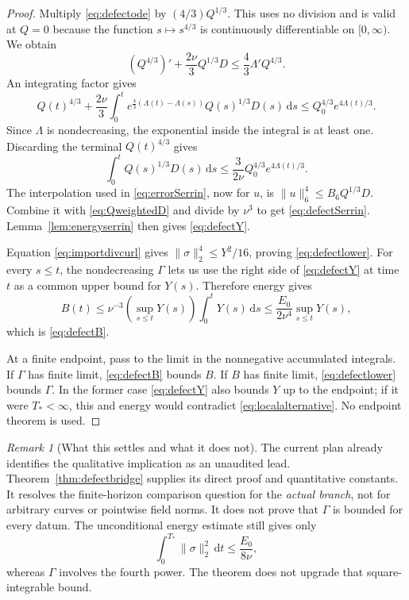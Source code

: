 \documentclass[11pt,a4paper]{article}
\theoremstyle{definition}\newtheorem{definition}[theorem]{Definition}
\theoremstyle{remark}\newtheorem{remark}[theorem]{Remark}
\newcommand{\dd}{\,\mathrm d}
\newcommand{\norm}[1]{\lVert #1\rVert}
\numberwithin{equation}{section}
\begin{document}
\begin{proof}
Multiply \eqref{eq:defectode} by $(4/3)Q^{1/3}$. This uses no division and is valid at $Q=0$ because the function $s\mapsto s^{4/3}$ is continuously differentiable on $[0,\infty)$. We obtain
\[
 (Q^{4/3})'+\frac{2\nu}{3}Q^{1/3}D
 \le\frac43\Lambda'Q^{4/3}.
\]
An integrating factor gives
\begin{equation}\label{eq:weightedQ43}
 Q(t)^{4/3}+\frac{2\nu}{3}
 \int_0^t e^{\frac43(\Lambda(t)-\Lambda(s))}Q(s)^{1/3}D(s)\dd s
 \le Q_0^{4/3}e^{4\Lambda(t)/3}.
\end{equation}
Since $\Lambda$ is nondecreasing, the exponential inside the integral is at least one. Discarding the terminal $Q(t)^{4/3}$ gives
\begin{equation}\label{eq:QweightedD}
 \int_0^t Q(s)^{1/3}D(s)\dd s
 \le\frac3{2\nu}Q_0^{4/3}e^{4\Lambda(t)/3}.
\end{equation}
The interpolation used in \eqref{eq:errorSerrin}, now for $u$, is
$\norm u_6^4\le B_6Q^{1/3}D$. Combine it with \eqref{eq:QweightedD} and divide by $\nu^3$ to get \eqref{eq:defectSerrin}. Lemma~\ref{lem:energyserrin} then gives \eqref{eq:defectY}.

Equation \eqref{eq:importdivcurl} gives $\norm\sigma_2^4\le Y^2/16$, proving \eqref{eq:defectlower}. For every $s\le t$, the nondecreasing $\Gamma$ lets us use the right side of \eqref{eq:defectY} at time $t$ as a common upper bound for $Y(s)$. Therefore energy gives
\[
 B(t)\le\nu^{-3}\left(\sup_{s\le t}Y(s)\right)\int_0^tY(s)\dd s
 \le\frac{E_0}{2\nu^4}\sup_{s\le t}Y(s),
\]
which is \eqref{eq:defectB}.

At a finite endpoint, pass to the limit in the nonnegative accumulated integrals. If $\Gamma$ has finite limit, \eqref{eq:defectB} bounds $B$. If $B$ has finite limit, \eqref{eq:defectlower} bounds $\Gamma$. In the former case \eqref{eq:defectY} also bounds $Y$ up to the endpoint; if it were $T_*<\infty$, this and energy would contradict \eqref{eq:localalternative}. No endpoint theorem is used.
\end{proof}

\begin{remark}[What this settles and what it does not]
The current plan already identifies the qualitative implication as an unaudited lead. Theorem~\ref{thm:defectbridge} supplies its direct proof and quantitative constants. It resolves the finite-horizon comparison question for the \emph{actual branch}, not for arbitrary curves or pointwise field norms. It does not prove that $\Gamma$ is bounded for every datum. The unconditional energy estimate still gives only
\[
 \int_0^{T_*}\norm\sigma_2^2\dd t\le\frac{E_0}{8\nu},
\]
whereas $\Gamma$ involves the fourth power. The theorem does not upgrade that square-integrable bound.
\end{remark}
\end{document}
